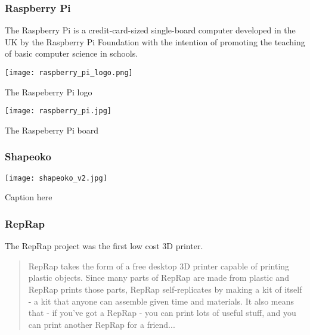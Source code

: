 \subsubsection{Raspberry Pi} %
\begin{row}{4}{2}
    \begin{cell}{3}
    The Raspberry Pi is a credit-card-sized single-board computer developed in the UK by the Raspberry Pi Foundation with the intention of promoting the teaching of basic computer science in schools.
    \end{cell}
    \begin{cell}{1}
    \begin{NFfigure}
    \begin{center}
        \texttt{[image: raspberry\_pi\_logo.png]}
    \end{center}
    \caption{The Raspeberry Pi logo}
    \label{fig:raspberry_pi_logo}
\end{NFfigure}
    \end{cell}
\end{row}




\begin{NFfigure}
    \begin{center}
        \texttt{[image: raspberry\_pi.jpg]}
    \end{center}
    \caption{The Raspeberry Pi board}
    \label{fig:raspberry_pi}
\end{NFfigure}

\subsubsection{Shapeoko} %

\begin{NFfigure}
    \begin{center}
        \texttt{[image: shapeoko\_v2.jpg]}
    \end{center}
    \caption{Caption here}
    \label{fig:shapeoko_v2}
\end{NFfigure}

\subsubsection{RepRap} %

The RepRap project was the first low cost 3D printer.
\begin{quotation}
RepRap takes the form of a free desktop 3D printer capable of printing plastic objects. Since many parts of RepRap are made from plastic and RepRap prints those parts, RepRap self-replicates by making a kit of itself - a kit that anyone can assemble given time and materials. It also means that - if you've got a RepRap - you can print lots of useful stuff, and you can print another RepRap for a friend...
\end{quotation}


